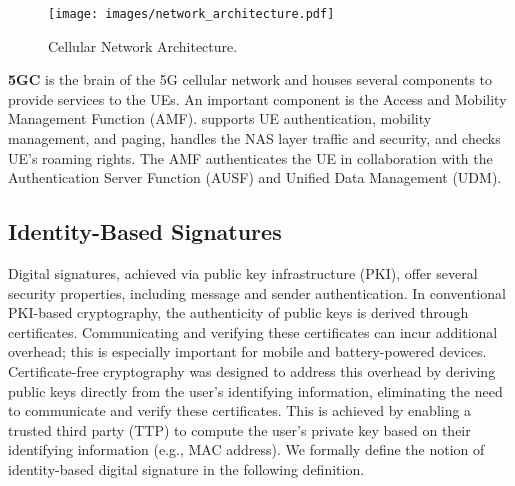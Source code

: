 \begin{figure}[t]
 \centering
        \texttt{[image: images/network\_architecture.pdf]}
        \caption{Cellular Network Architecture.}
        \label{network_architecture}
\end{figure}

\noindent  \textbf{5GC} is the brain of the 5G cellular network and houses several components to provide services to the UEs. An important component is the Access and Mobility Management Function (AMF).
supports UE authentication, mobility management, and paging, handles the NAS layer traffic and security, and checks UE's roaming rights. The AMF authenticates the UE in collaboration with the Authentication Server Function (AUSF) and Unified Data Management (UDM). 

\subsection{Identity-Based Signatures}

Digital signatures, achieved via public key infrastructure (PKI), offer several security properties, including message and sender authentication. 
In conventional PKI-based cryptography, the authenticity of public keys is derived through certificates. 
Communicating and verifying these certificates can incur additional overhead; this is especially important for mobile and battery-powered devices.  
Certificate-free cryptography was designed to address this overhead by deriving public keys directly from the user's identifying information, eliminating the need to communicate and verify these certificates. 
This is achieved by enabling a trusted third party (TTP) to compute the user's private key based on their identifying information (e.g., MAC address). 
We formally define the notion of identity-based digital signature in the following definition. 

